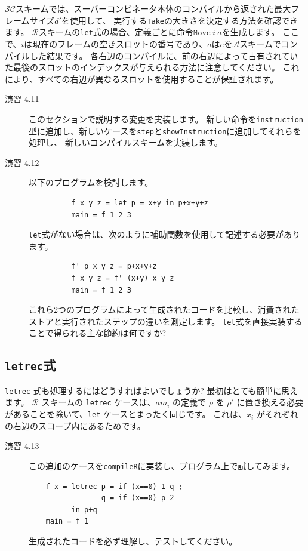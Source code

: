 \documentclass{jbook}
\begin{document}
$\mathcal{SC}$スキームでは、スーパーコンビネータ本体のコンパイルから返された最大フレームサイズ$d'$を使用して、
実行する\texttt{Take}の大きさを決定する方法を確認できます。
$\mathcal{R}$スキームの\texttt{let}式の場合、定義ごとに命令$\texttt{Move} ~ i ~ a$を生成します。
ここで、$i$は現在のフレームの空きスロットの番号であり、$a$は$e$を$\mathcal{A}$スキームでコンパイルした結果です。
各右辺のコンパイルに、前の右辺によって占有されていた最後のスロットのインデックスが与えられる方法に注意してください。
これにより、すべての右辺が異なるスロットを使用することが保証されます。

\begin{description}
	\item[演習 4.11] このセクションで説明する変更を実装します。
		新しい命令を\texttt{instruction}型に追加し、新しいケースを\texttt{step}と\texttt{showInstruction}に追加してそれらを処理し、
		新しいコンパイルスキームを実装します。
	\item[演習 4.12] 以下のプログラムを検討します。
		\begin{verbatim}
          f x y z = let p = x+y in p+x+y+z
          main = f 1 2 3
        \end{verbatim}
		\texttt{let}式がない場合は、次のように補助関数を使用して記述する必要があります。
		\begin{verbatim}
          f' p x y z = p+x+y+z
          f x y z = f' (x+y) x y z
          main = f 1 2 3
        \end{verbatim}
		これら2つのプログラムによって生成されたコードを比較し、消費されたストアと実行されたステップの違いを測定します。
		\texttt{let}式を直接実装することで得られる主な節約は何ですか?
\end{description}

\subsection{\texttt{letrec}式}

\texttt{letrec} 式も処理するにはどうすればよいでしょうか?
最初はとても簡単に思えます。
$\mathcal{R}$ スキームの \texttt{letrec} ケースは、$am_i$ の定義で $\rho$ を $\rho'$ に置き換える必要があることを除いて、\texttt{let} ケースとまったく同じです。
これは、$x_i$ がそれぞれの右辺のスコープ内にあるためです。

\begin{description}
	\item[演習 4.13] この追加のケースを\texttt{compileR}に実装し、プログラム上で試してみます。
		\begin{verbatim}
    f x = letrec p = if (x==0) 1 q ;
                 q = if (x==0) p 2
          in p+q
    main = f 1
  \end{verbatim}
		生成されたコードを必ず理解し、テストしてください。
\end{description}
\end{document}

